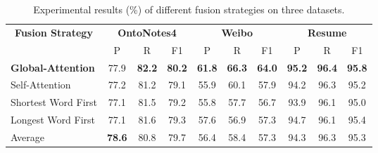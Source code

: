 \documentclass[conference]{IEEEtran}
\begin{document}
    
    \begin{table*}[htbp]
                \caption{Experimental results (\%)  of different fusion strategies on three datasets.
            }\label{result3}
\centering
\begin{tabular}{|l|
                    c|c|c|
                    c|c|c|
                    c|c|c|
}
                    \hline
                    \multicolumn{1}{|c|}{\multirow{2}{*}{\textbf{Fusion Strategy}}} 
                    & \multicolumn{3}{|c|}{\textbf{OntoNotes4}}  
                    & \multicolumn{3}{|c|}{\textbf{Weibo}}  
                    &\multicolumn{3}{|c|}{\textbf{Resume}}       
\\
                    \cline{2-10}
                    \multicolumn{1}{|c|}{}  
                    & \multicolumn{1}{|c|}{P}  & \multicolumn{1}{|c|}{R} & \multicolumn{1}{|c|}{F1} 
                    & \multicolumn{1}{|c|}{P} & \multicolumn{1}{|c|}{R} & \multicolumn{1}{|c|}{F1} 
                    & \multicolumn{1}{|c|}{P} & \multicolumn{1}{|c|}{R} & \multicolumn{1}{|c|}{F1} 
\\
                    \hline
                    \textbf{Global-Attention} 
                        &77.9	&\textbf{ 82.2 } 	&\textbf{ 80.2 } 
                        &\textbf{ 61.8 }	&\textbf{ 66.3 } 	&\textbf{ 64.0 }
                        &\textbf{ 95.2 } 	&\textbf{ 96.4 } 	&\textbf{ 95.8 } 
\\
                    Self-Attention
                        &77.2 	&81.2 	&79.1 
                        &55.9 	&60.1 	&57.9 
                        &94.2 	&96.3 &	95.2 
\\
                    Shortest Word First
                        &77.1   &81.5   &79.2  
                        &55.8 	&57.7 	&56.7   
                        &93.9 	&96.1 	&95.0   
\\
                    Longest Word First 
                        &77.1     &81.6  & 79.3   
                        &57.6 	&56.9 	&57.3 
                        &94.7 	&96.1 	&95.4 
\\
                    Average 
                        &\textbf{  78.6 }    &80.8     & 79.7     
                        &56.4 	&58.4 	&57.3  
                        &94.3 	&96.3 	&95.3 
            
\\
                    \hline
                    \end{tabular}
\end{table*}
               
\end{document}
